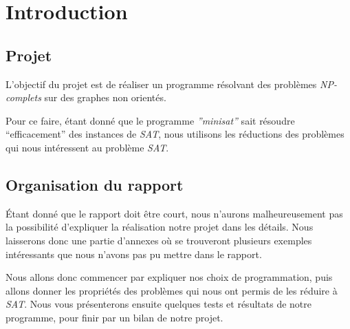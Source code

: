  \section{Introduction}

  \subsection{Projet}
  L'objectif du projet est de réaliser un programme résolvant des
  problèmes \emph{NP-complets} sur des graphes non orientés.

  Pour ce faire, étant donné que le programme \emph{''minisat''} sait
  résoudre ``efficacement'' des instances de \emph{SAT}, nous utilisons
  les réductions des problèmes qui nous intéressent au problème
  \emph{SAT}.

  \subsection{Organisation du rapport}
  Étant donné que le rapport doit être court, nous n'aurons
  malheureusement pas la possibilité d'expliquer la réalisation notre
  projet dans les détails. Nous laisserons donc une partie d'annexes où
  se trouveront plusieurs exemples intéressants que nous n'avons pas pu
  mettre dans le rapport.

  Nous allons donc commencer par expliquer nos choix de programmation,
  puis allons donner les propriétés des problèmes qui nous ont permis de
  les réduire à \emph{SAT}. Nous vous présenterons ensuite quelques
  tests et résultats de notre programme, pour finir par un bilan de
  notre projet.